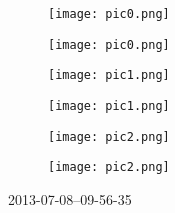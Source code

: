 \documentclass[10pt,a6paper,DIV=60]{scrartcl}
\begin{document}
\begin{figure}[h]
  \begin{minipage}[b]{0.48\linewidth}
    \texttt{[image: pic0.png]}
  \end{minipage}
  \hfill
  \begin{minipage}[b]{0.48\linewidth}
    \texttt{[image: pic0.png]}
  \end{minipage}
\end{figure}
\vspace{-1em}
\begin{figure}[h]
  \begin{minipage}[b]{0.48\linewidth}
    \texttt{[image: pic1.png]}
  \end{minipage}
  \hfill
  \begin{minipage}[b]{0.48\linewidth}
    \texttt{[image: pic1.png]}
  \end{minipage}
\end{figure}
\vspace{-1em}
\begin{figure}[h]
  \begin{minipage}[b]{0.48\linewidth}
    \texttt{[image: pic2.png]}
  \end{minipage}
  \hfill
  \begin{minipage}[b]{0.48\linewidth}
    \texttt{[image: pic2.png]}
  \end{minipage}
\end{figure}
\vfill
\tiny{2013-07-08--09-56-35}
\end{document}
